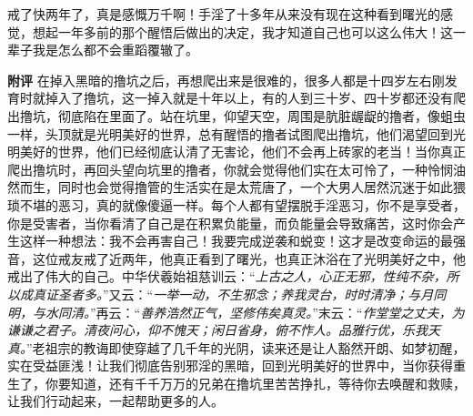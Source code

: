 \begin{case}
    戒了快两年了，真是感慨万千啊！手淫了十多年从来没有现在这种看到曙光的感觉，想起一年多前的那个醒悟后做出的决定，我才知道自己也可以这么伟大！这一辈子我是怎么都不会重蹈覆辙了。

    \textbf{附评} 在掉入黑暗的撸坑之后，再想爬出来是很难的，很多人都是十四岁左右刚发育时就掉入了撸坑，这一掉入就是十年以上，有的人到三十岁、四十岁都还没有爬出撸坑，彻底陷在里面了。站在坑里，仰望天空，周围是肮脏龌龊的撸者，像蛆虫一样，头顶就是光明美好的世界，总有醒悟的撸者试图爬出撸坑，他们渴望回到光明美好的世界，他们已经彻底认清了无害论，他们不会再上砖家的老当！当你真正爬出撸坑时，再回头望向坑里的撸者，你就会觉得他们实在太可怜了，一种怜悯油然而生，同时也会觉得撸管的生活实在是太荒唐了，一个大男人居然沉迷于如此猥琐不堪的恶习，真的就像傻逼一样。每个人都有望摆脱手淫恶习，你不是享受者，你是受害者，当你看清了自己是在积累负能量，而负能量会导致痛苦，这时你会产生这样一种想法：我不会再害自己！我要完成逆袭和蜕变！这才是改变命运的最强音，这位戒友戒了近两年，他真正看到了曙光，也真正沐浴在了光明美好之中，他戒出了伟大的自己。中华伏羲始祖慈训云：“\textit{上古之人，心正无邪，性纯不杂，所以成真证圣者多。}”又云：“\textit{一举一动，不生邪念；养我灵台，时时清净；与月同明，与水同清。}”再云：“\textit{善养浩然正气，坚修伟矣真灵。}”末云：“\textit{作堂堂之丈夫，为谦谦之君子。清夜问心，仰不愧天；闲日省身，俯不怍人。品雅行优，乐我天真。}”老祖宗的教诲即使穿越了几千年的光阴，读来还是让人豁然开朗、如梦初醒，实在受益匪浅！让我们彻底告别邪淫的黑暗，回到光明美好的世界中，当你获得重生了，你要知道，还有千千万万的兄弟在撸坑里苦苦挣扎，等待你去唤醒和救赎，让我们行动起来，一起帮助更多的人。
\end{case}

